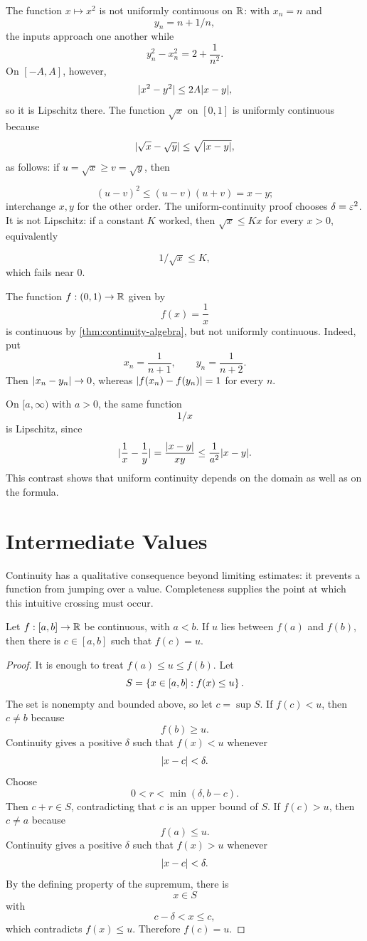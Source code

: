 \begin{example}
The function $x\mapsto x^2$ is not uniformly continuous on $\mathbb{R}$: with
$x_n=n$ and
\[
y_n=n+1/n,
\]
 the inputs approach one another while
\[
y_n^2-x_n^2=2+\frac1{n^2}.
\]
On $[-A,A]$, however,
\[
\lvert x^2-y^2\rvert\leq2A\lvert x-y\rvert,
\]
so it is Lipschitz there.  The function $\sqrt{x}$ on $[0,1]$ is uniformly
continuous because
\[
\lvert \sqrt{x}-\sqrt{y}\rvert\leq\sqrt{\lvert x-y\rvert},
\]
as follows: if $u=\sqrt{x}\geq v=\sqrt{y}$, then

\[
(u-v)^2\leq(u-v)(u+v)=x-y;
\]
 interchange $x,y$ for the other order.
The uniform-continuity proof chooses $\delta=\varepsilon^2$.
It is not Lipschitz: if a
constant $K$ worked, then $\sqrt{x}\leq Kx$ for every $x>0$, equivalently

\[
1/\sqrt{x}\leq K,
\]
 which fails near $0$.
\end{example}

\begin{example}
The function $f:(0,1)\to\mathbb{R}$ given by
\[
f(x)=\frac1x
\]
 is continuous by
\cref{thm:continuity-algebra}, but not uniformly continuous. Indeed, put
\[x_n=\frac1{n+1},\qquad y_n=\frac1{n+2}.\]
Then
$\lvert x_n-y_n\rvert\to0$, whereas $\lvert f(x_n)-f(y_n)\rvert=1$ for every $n$.
\end{example}

On $[a,\infty)$ with $a>0$, the same function
\[
1/x
\]
 is Lipschitz, since
\[
\lvert \frac1x-\frac1y\rvert=\frac{\lvert x-y\rvert}{xy}
\leq\frac1{a^2}\lvert x-y\rvert.
\]
This contrast shows that uniform continuity depends on the domain as well
as on the formula.

\section{Intermediate Values}

Continuity has a qualitative consequence beyond limiting estimates: it
prevents a function from jumping over a value.  Completeness supplies the
point at which this intuitive crossing must occur.

\begin{theorem}
\label{thm:ivt}
Let $f:[a,b]\to\mathbb{R}$ be continuous, with $a<b$. If $u$ lies between $f(a)$ and $f(b)$, then there is $c\in[a,b]$ such that $f(c)=u$.
\end{theorem}
\begin{proof}
It is enough to treat $f(a)\leq u\leq f(b)$. Let
\[
S=\left\{x\in[a,b]:f(x)\leq u\right\}.
\]
The set is nonempty and bounded above, so let $c=\sup S$. If $f(c)<u$, then $c\ne b$ because
\[
f(b)\geq u.
\]
Continuity gives a positive $\delta$ such that $f(x)<u$ whenever
\[
\lvert x-c\rvert<\delta.
\]
Choose
\[
0<r<\min(\delta,b-c).
\]
Then $c+r\in S$, contradicting that $c$ is an upper bound of $S$. If $f(c)>u$, then $c\ne a$ because
\[
f(a)\leq u.
\]
Continuity gives a positive $\delta$ such that $f(x)>u$ whenever
\[
\lvert x-c\rvert<\delta.
\]
By the defining property of the supremum, there is
\[
x\in S
\]
with
\[
c-\delta<x\leq c,
\]
which contradicts $f(x)\leq u$. Therefore $f(c)=u$.
\end{proof}

